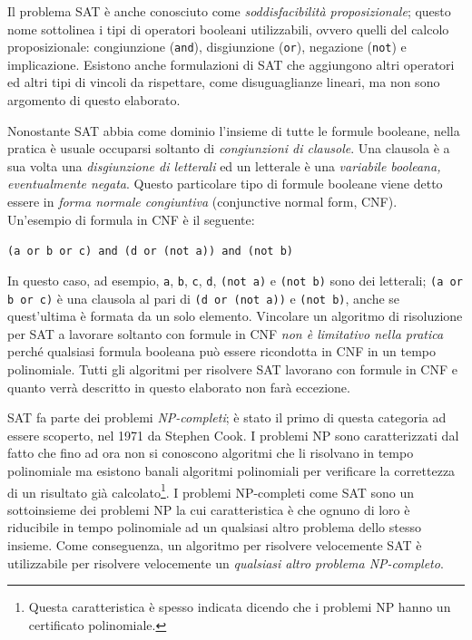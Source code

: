 \documentclass[12pt, a4paper, twosides]{report}
\begin{document}
Il problema SAT è anche conosciuto come \textit{soddisfacibilità proposizionale}; questo nome sottolinea i tipi di operatori booleani utilizzabili, ovvero quelli del calcolo proposizionale: congiunzione (\verb|and|), disgiunzione (\verb|or|), negazione (\verb|not|) e implicazione. Esistono anche formulazioni di SAT che aggiungono altri operatori ed altri tipi di vincoli da rispettare, come disuguaglianze lineari, ma non sono argomento di questo elaborato.

Nonostante SAT abbia come dominio l'insieme di tutte le formule booleane, nella pratica è usuale occuparsi soltanto di \textit{congiunzioni di clausole}. Una clausola è a sua volta una \textit{disgiunzione di letterali} ed un letterale è una \textit{variabile booleana, eventualmente negata}. Questo particolare tipo di formule booleane viene detto essere in \textit{forma normale congiuntiva} (conjunctive normal form, CNF). Un'esempio di formula in CNF è il seguente:

\begin{center}
\verb|(a or b or c) and (d or (not a)) and (not b)|
\end{center}

In questo caso, ad esempio, \verb|a|, \verb|b|, \verb|c|, \verb|d|, \verb|(not a)| e \verb|(not b)| sono dei letterali; \verb|(a or b or c)| è una clausola al pari di \verb|(d or (not a))| e \verb|(not b)|, anche se quest'ultima è formata da un solo elemento. Vincolare un algoritmo di risoluzione per SAT a lavorare soltanto con formule in CNF \textit{non è limitativo nella pratica} perché qualsiasi formula booleana può essere ricondotta in CNF in un tempo polinomiale. Tutti gli algoritmi per risolvere SAT lavorano con formule in CNF e quanto verrà descritto in questo elaborato non farà eccezione.

SAT fa parte dei problemi \textit{NP-completi}; è stato il primo di questa categoria ad essere scoperto, nel 1971 da Stephen Cook. I problemi NP sono caratterizzati dal fatto che fino ad ora non si conoscono algoritmi che li risolvano in tempo polinomiale ma esistono banali algoritmi polinomiali per verificare la correttezza di un risultato già calcolato\footnote{Questa caratteristica è spesso indicata dicendo che i problemi NP hanno un certificato polinomiale.}. I problemi NP-completi come SAT sono un sottoinsieme dei problemi NP la cui caratteristica è che ognuno di loro è riducibile in tempo polinomiale ad un qualsiasi altro problema dello stesso insieme. Come conseguenza, un algoritmo per risolvere velocemente SAT è utilizzabile per risolvere velocemente un \textit{qualsiasi altro problema NP-completo}.
\end{document}
